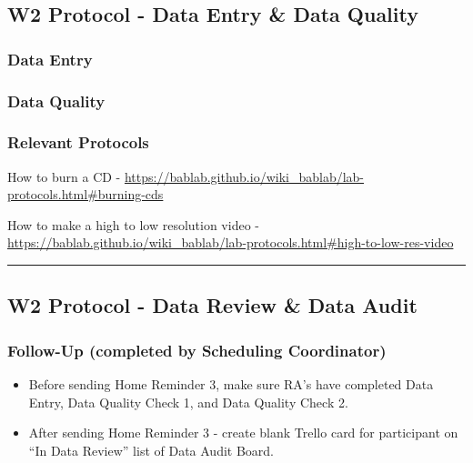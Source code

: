 \documentclass[]{book}
\providecommand{\tightlist}{%
  \setlength{\itemsep}{0pt}\setlength{\parskip}{0pt}}
\begin{document}
\hypertarget{w2-protocol---data-entry-data-quality}{%
\subsection{W2 Protocol - Data Entry \& Data Quality}\label{w2-protocol---data-entry-data-quality}}

\hypertarget{data-entry-6}{%
\subsubsection{Data Entry}\label{data-entry-6}}

\hypertarget{data-quality-4}{%
\subsubsection{Data Quality}\label{data-quality-4}}

\hypertarget{relevant-protocols-1}{%
\subsubsection{Relevant Protocols}\label{relevant-protocols-1}}

How to burn a CD - \url{https://bablab.github.io/wiki_bablab/lab-protocols.html\#burning-cds}

How to make a high to low resolution video - \url{https://bablab.github.io/wiki_bablab/lab-protocols.html\#high-to-low-res-video}

\begin{center}\rule{0.5\linewidth}{0.5pt}\end{center}

\hypertarget{w2-protocol---data-review-data-audit}{%
\subsection{W2 Protocol - Data Review \& Data Audit}\label{w2-protocol---data-review-data-audit}}

\hypertarget{follow-up-completed-by-scheduling-coordinator-2}{%
\subsubsection{Follow-Up (completed by Scheduling Coordinator)}\label{follow-up-completed-by-scheduling-coordinator-2}}

\begin{itemize}
\tightlist
\item
  Before sending Home Reminder 3, make sure RA's have completed Data Entry, Data Quality Check 1, and Data Quality Check 2.
\item
  After sending Home Reminder 3 - create blank Trello card for participant on ``In Data Review'' list of Data Audit Board.
\end{itemize}
\end{document}
